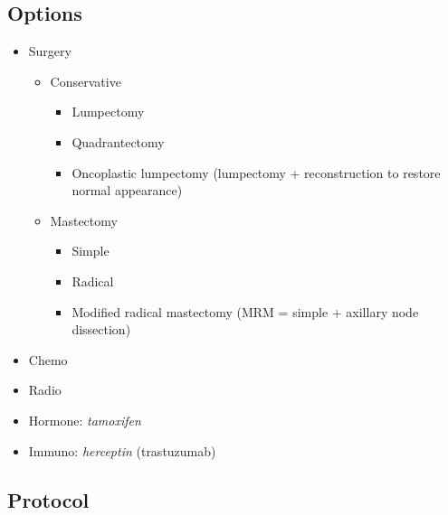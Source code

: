 \documentclass[
  12pt,
]{memoir}
\providecommand{\tightlist}{%
  \setlength{\itemsep}{0pt}\setlength{\parskip}{0pt}}
\begin{document}
\hypertarget{options}{%
\subsection{Options}\label{options}}

\begin{itemize}
\tightlist
\item
  Surgery

  \begin{itemize}
  \tightlist
  \item
    Conservative

    \begin{itemize}
    \tightlist
    \item
      Lumpectomy
    \item
      Quadrantectomy
    \item
      Oncoplastic lumpectomy (lumpectomy + reconstruction to restore
      normal appearance)
    \end{itemize}
  \item
    Mastectomy

    \begin{itemize}
    \tightlist
    \item
      Simple
    \item
      Radical
    \item
      Modified radical mastectomy (MRM = simple + axillary node
      dissection)
    \end{itemize}
  \end{itemize}
\item
  Chemo
\item
  Radio
\item
  Hormone: \emph{tamoxifen}
\item
  Immuno: \emph{herceptin} (trastuzumab)
\end{itemize}

\hypertarget{protocol}{%
\subsection{Protocol}\label{protocol}}
\end{document}
